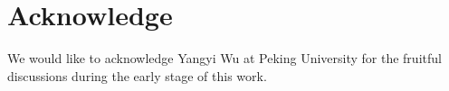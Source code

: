 \documentclass[conference]{IEEEtran}
\begin{document}



%
% 




\section*{Acknowledge}
We would like to acknowledge Yangyi Wu at Peking University for the
fruitful discussions during the early stage of this work.



\end{document}
